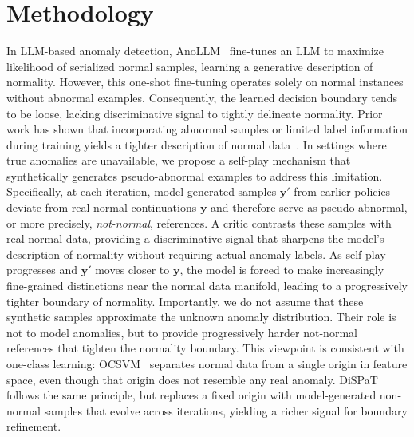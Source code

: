 \section{Methodology} \label{3:methodology}

In LLM-based anomaly detection, AnoLLM~\citep{tsai2025anollm} fine-tunes an LLM to maximize likelihood of serialized normal samples, learning a generative description of normality. However, this one-shot fine-tuning operates solely on normal instances without abnormal examples. Consequently, the learned decision boundary tends to be loose, lacking discriminative signal to tightly delineate normality. Prior work has shown that incorporating abnormal samples or limited label information during training yields a tighter description of normal data~\citep{le2010optimal, le2013fuzzy, ruff2019deep, pang2019deep, ding2022catching}. In settings where true anomalies are unavailable, we propose a self-play mechanism that synthetically generates pseudo-abnormal examples to address this limitation. Specifically, at each iteration, model-generated samples $\boldsymbol{y}'$ from earlier policies deviate from real normal continuations $\boldsymbol{y}$ and therefore serve as pseudo-abnormal, or more precisely, \emph{not-normal}, references. A critic contrasts these samples with real normal data, providing a discriminative signal that sharpens the model's description of normality without requiring actual anomaly labels. As self-play progresses and $\boldsymbol{y}'$ moves closer to $\boldsymbol{y}$, the model is forced to make increasingly fine-grained distinctions near the normal data manifold, leading to a progressively tighter boundary of normality. Importantly, we do not assume that these synthetic samples approximate the unknown anomaly distribution. Their role is not to model anomalies, but to provide progressively harder not-normal references that tighten the normality boundary. This viewpoint is consistent with one-class learning: OCSVM~\citep{scholkopf2001estimating} separates normal data from a single origin in feature space, even though that origin does not resemble any real anomaly. DiSPaT follows the same principle, but replaces a fixed origin with model-generated non-normal samples that evolve across iterations, yielding a richer signal for boundary refinement. 

